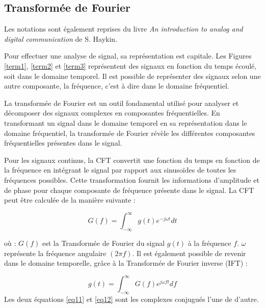 \subsection{Transformée de Fourier}

Les notations sont également reprises du livre \textit{An introduction to analog and digital communication} de S. Haykin\cite{book1}.

\vspace{0.1cm}

Pour effectuer une analyse de signal, sa représentation est capitale. Les Figures \ref{term1}, \ref{term2} et \ref{term3} représentent des signaux en fonction du temps écoulé, soit dans le domaine temporel. Il est possible de représenter des signaux selon une autre composante, la fréquence, c'est à dire dans le domaine fréquentiel.

\vspace{0.1cm}

La transformée de Fourier est un outil fondamental utilisé pour analyser et décomposer des signaux complexes en composantes fréquentielles. En transformant un signal dans le domaine temporel en sa représentation dans le domaine fréquentiel, la transformée de Fourier révèle les différentes composantes fréquentielles présentes dans le signal.

\vspace{0.1cm}

Pour les signaux continus, la \ac{CFT} convertit une fonction du temps en fonction de la fréquence en intégrant le signal par rapport aux sinusoïdes de toutes les fréquences possibles. Cette transformation fournit les informations d'amplitude et de phase pour chaque composante de fréquence présente dans le signal. La \ac{CFT} peut être calculée de la manière suivante :  

\begin{equation}\label{eq11}
G(f) = \int_{-\infty}^{\infty} g(t)e^{-j\omega t} dt
\end{equation}

où : $G(f)$ est la Transformée de Fourier du signal $g(t)$ à la fréquence $f$. $\omega$ représente la fréquence angulaire $(2 \pi f)$.
Il est également possible de revenir dans le domaine temporelle, grâce à la Transformée de Fourier inverse (IFT) :

\begin{equation}\label{eq12}
g(t) = \int_{-\infty}^{\infty} G(f)e^{j\omega ft} df
\end{equation}
Les deux équations \ref{eq11} et \ref{eq12} sont les complexes conjugués l'une de d'autre.


